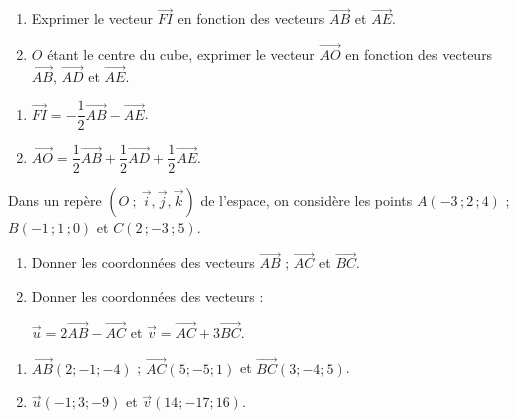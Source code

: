 \begin{colonne*exercice}
\begin{exercice*}
  \begin{enumerate}
  \item Exprimer le vecteur $\overrightarrow{FI}$ en fonction des
    vecteurs $\overrightarrow{AB}$ et $\overrightarrow{AE}$.
  \item $O$ étant le centre du cube, exprimer le vecteur
    $\overrightarrow{AO}$ en fonction des vecteurs
    $\overrightarrow{AB}$, $\overrightarrow{AD}$ et
    $\overrightarrow{AE}$.
  \end{enumerate}
\end{exercice*}
\begin{corrige}
  \begin{enumerate}
\item  $\overrightarrow{FI}=-\dfrac{1}{2}\overrightarrow{AB}-\overrightarrow{AE}$.
\item $\overrightarrow{AO}=\dfrac{1}{2}\overrightarrow{AB}+\dfrac{1}{2}\overrightarrow{AD}+\dfrac{1}{2}\overrightarrow{AE}$.
\end{enumerate}
\end{corrige}

\begin{exercice*}
  Dans un repère $(O\ ;\ \vec{i},\vec{j},\vec{k})$ de l'espace, on
  considère les points $A(-3\,;2\,;4)$ ; $B(-1\,;1\,;0)$ et $C(2\,;-3\,;5)$.
  \begin{enumerate}
  \item Donner les coordonnées des vecteurs $\overrightarrow{AB}$ ;
    $\overrightarrow{AC}$ et $\overrightarrow{BC}$.

  \item Donner les coordonnées des vecteurs :

    $\overrightarrow{u}=2\overrightarrow{AB}-\overrightarrow{AC}$ et
    $\overrightarrow{v}=\overrightarrow{AC}+3\overrightarrow{BC}$.
  \end{enumerate}
\end{exercice*}
\begin{corrige}
  \begin{enumerate}
\item  $\overrightarrow{AB}(2;-1;-4)$ ; $\overrightarrow{AC}(5;-5;1)$ et $\overrightarrow{BC}(3;-4;5)$.
\item 
$\overrightarrow{u}(-1;3;-9)$ et $\overrightarrow{v}(14;-17;16)$.
\end{enumerate}
\end{corrige}


\end{colonne*exercice}
